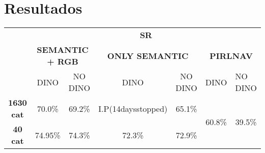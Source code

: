 \section{Resultados}


\begin{table}[H]
\begin{tabular}{l|cccccc|}
\cline{2-7}
                                               & \multicolumn{6}{c|}{\textbf{SR}}                                                                                                                                                                  \\ \cline{2-7}
\textbf{}                                      & \multicolumn{2}{c|}{\textbf{SEMANTIC + RGB}}                & \multicolumn{2}{c|}{\textbf{ONLY SEMANTIC}}              & \multicolumn{2}{c|}{\textbf{PIRLNAV}}                                    \\ \cline{2-7}
                                               & \multicolumn{1}{c|}{DINO}    & \multicolumn{1}{c|}{NO DINO} & \multicolumn{1}{c|}{DINO} & \multicolumn{1}{c|}{NO DINO} & \multicolumn{1}{l|}{DINO}                 & \multicolumn{1}{l|}{NO DINO} \\ \hline
\multicolumn{1}{|c|}{\textbf{1630 cat}} & \multicolumn{1}{c|}{70.0\%}  & \multicolumn{1}{c|}{69.2\%}  & \multicolumn{1}{c|}{I.P(14daysstopped)}     & \multicolumn{1}{c|}{65.1\%}  & \multicolumn{1}{c|}{\multirow{2}{*}{60.8\%}} & \multirow{2}{*}{39.5\%}         \\ \cline{1-5}
\multicolumn{1}{|c|}{\textbf{40 cat}}   & \multicolumn{1}{c|}{\cellcolor{lightblue}74.95\%} & \multicolumn{1}{c|}{74.3\%} & \multicolumn{1}{c|}{72.3\%}     & \multicolumn{1}{c|}{72.9\%}        & \multicolumn{1}{c|}{}                     &                              \\ \hline
\end{tabular}
\end{table}